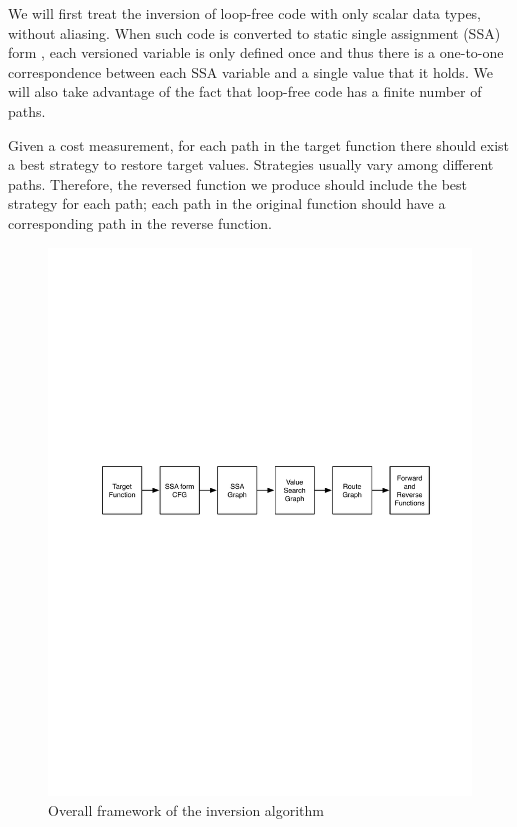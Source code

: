 \documentclass[12pt]{gatech-thesis}
\begin{document}
We will first treat the inversion of loop-free code with only scalar data types, without aliasing.
When such code is converted to static single assignment (SSA) form \cite{Cytron1991}, each versioned variable is only defined once and thus there is a one-to-one correspondence between each SSA variable and a single value that it holds.
We will also take advantage of the fact that loop-free code has a finite number of paths.

Given a cost measurement, for each path in the target function there should exist a best strategy to restore target values. 
Strategies usually vary among different paths. 
Therefore, the reversed function we produce should include the best strategy for each path; each path in the original function should have a corresponding path in the reverse function. 

\begin{figure}
\centering
\includegraphics[width=400pt]{figures1/Framework.pdf}
\caption{Overall framework of the inversion algorithm}
\label{fig:framework}
\end{figure}
\end{document}
